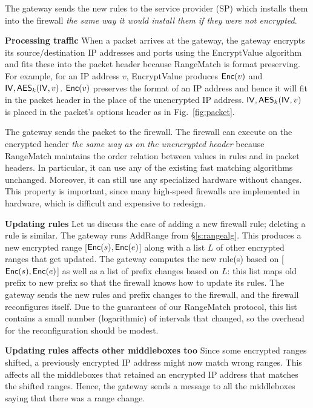 The gateway sends the new rules to the service provider (SP) which installs them into the firewall {\em the same way it would install 
them if they were not encrypted}. 

\noindent\textbf{Processing traffic}
When a packet arrives at the gateway, the gateway encrypts its source/destination IP addresses and ports using the EncryptValue algorithm
and fits these into the packet header because RangeMatch is format preserving.
For example, for an IP address $v$, EncryptValue produces $\mathsf{Enc}(v)$ and $\mathsf{IV}, \mathsf{AES}_k(\mathsf{IV}, v)$.
 $\mathsf{Enc}(v)$ preserves the format of an IP address and hence 
it will fit in the packet header in the place of the unencrypted IP address. $\mathsf{IV}, \mathsf{AES}_k(\mathsf{IV}, v)$ is placed in the packet's options header as in Fig.~\ref{fig:packet}.

The gateway sends the packet to the firewall. The firewall can execute on the encrypted header {\em
the same way as on the unencrypted header} because RangeMatch maintains the order relation between values in rules and in 
packet headers. 
In particular, it can use any of the existing fast matching algorithms unchanged. 
Moreover, it can still use  any specialized hardware without changes. This property is important, since many high-speed firewalls are implemented in hardware, which is difficult and expensive to redesign.


\noindent\textbf{Updating rules} 
Let us discuss the case of adding a new firewall rule; deleting a rule is similar.
The gateway runs AddRange from \S\ref{s:rangealg}. This produces a new encrypted range [$\mathsf{Enc}(s), \mathsf{Enc}(e)$] 
along with a list $L$ of other encrypted ranges that get updated. 
The gateway computes the new rule(s) based on [$\mathsf{Enc}(s), \mathsf{Enc}(e)$] as well as a list of prefix changes based on $L$: this list maps old prefix to new prefix so that the firewall knows how to update its rules. 
The gateway sends the new rules and prefix changes to the firewall, and the firewall reconfigures itself. 
  Due to the guarantees of our RangeMatch protocol, this list contains a 
small number (logarithmic) of intervals that changed, so the overhead for the reconfiguration should be modest.


\noindent\textbf{Updating rules affects other middleboxes too}
Since some encrypted ranges shifted, a previously encrypted IP address might now match wrong ranges.
This affects all the middleboxes that retained an encrypted IP address that matches the shifted ranges. 
Hence, the gateway sends a message to all the middleboxes saying that there was a range change. 

